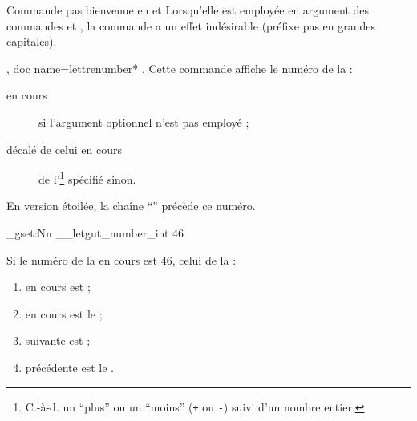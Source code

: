 \documentclass{letgut}
\begin{document}
\begin{dbwarning}{Commande  pas bienvenue en  et
    }{}
  Lorsqu'elle est employée en argument des commandes  et
  , la commande  a un effet indésirable
  (préfixe pas en grandes capitales).
\end{dbwarning}

\begin{docCommands}[
    doc new=2022-10-03,
    doc name=lettrenumber,
    doc parameter = \oarg{entier relatif signé}
  ]
  {
    { },
    { doc name=lettrenumber* },
  }
  Cette commande affiche le numéro de la  :
  \begin{description}
  \item[en cours] si l'argument optionnel n'est pas employé ;
  \item[décalé de celui en cours] de l'\footnote{\label{entier-signe}C.-à-d. un \enquote{plus} ou un
      \enquote{moins} (\lstinline|+| ou \lstinline|-|) suivi d'un nombre
      entier.} spécifié sinon.
  \end{description}
  En version étoilée, la chaîne \enquote{\no{}} précède ce numéro.
\end{docCommands}

\ExplSyntaxOn
\int_gset:Nn \g__letgut_number_int {46}
\ExplSyntaxOff

\begin{ltx-code-result}[title addon=emploi de la commande \refCom{lettrenumber},listing options app={deletekeywords={[6]{cours,lettre}}}]
Si le numéro de la  en cours est 46,
celui de la  :
\begin{enumerate}
\item en cours est  ;
\item en cours est le  ;
\item suivante est  ;
\item précédente est le .
\end{enumerate}
\end{ltx-code-result}
\end{document}
